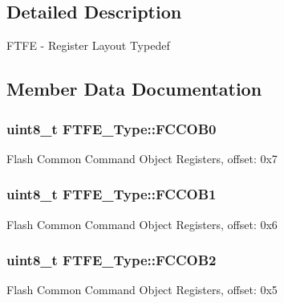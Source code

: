 \subsection{Detailed Description}
F\+T\+FE -\/ Register Layout Typedef 

\subsection{Member Data Documentation}
\subsubsection[{\texorpdfstring{F\+C\+C\+O\+B0}{FCCOB0}}]{ uint8\+\_\+t F\+T\+F\+E\+\_\+\+Type\+::\+F\+C\+C\+O\+B0}\hypertarget{structFTFE__Type_a0a8aa6eadd81f1905d667fe5913250a9}{}\label{structFTFE__Type_a0a8aa6eadd81f1905d667fe5913250a9}
Flash Common Command Object Registers, offset\+: 0x7 
\subsubsection[{\texorpdfstring{F\+C\+C\+O\+B1}{FCCOB1}}]{ uint8\+\_\+t F\+T\+F\+E\+\_\+\+Type\+::\+F\+C\+C\+O\+B1}\hypertarget{structFTFE__Type_ae8fc27166f31457cda3358ed9c89a04b}{}\label{structFTFE__Type_ae8fc27166f31457cda3358ed9c89a04b}
Flash Common Command Object Registers, offset\+: 0x6 
\subsubsection[{\texorpdfstring{F\+C\+C\+O\+B2}{FCCOB2}}]{ uint8\+\_\+t F\+T\+F\+E\+\_\+\+Type\+::\+F\+C\+C\+O\+B2}\hypertarget{structFTFE__Type_ae595ecb7bc42f54f9d912e02929bc12e}{}\label{structFTFE__Type_ae595ecb7bc42f54f9d912e02929bc12e}
Flash Common Command Object Registers, offset\+: 0x5 
